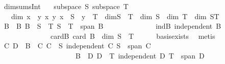 \begin{isabellebody}
\isanewline
%
\endisadelimproof
\isanewline
{}\isamarkupfalse%
\ dim{\isacharunderscore}{\kern0pt}sums{\isacharunderscore}{\kern0pt}Int{\isacharcolon}{\kern0pt}\isanewline
\ \ \ {\isachardoublequoteopen}subspace\ S{\isachardoublequoteclose}\ {\isachardoublequoteopen}subspace\ T{\isachardoublequoteclose}\isanewline
\ \ \ {\isachardoublequoteopen}dim\ {\isacharbraceleft}{\kern0pt}x\ {\isacharplus}{\kern0pt}\ y\ {\isacharbar}{\kern0pt}x\ y{\isachardot}{\kern0pt}\ x\ {\isasymin}\ S\ {\isasymand}\ y\ {\isasymin}\ T{\isacharbraceright}{\kern0pt}\ {\isacharplus}{\kern0pt}\ dim{\isacharparenleft}{\kern0pt}S\ {\isasyminter}\ T{\isacharparenright}{\kern0pt}\ {\isacharequal}{\kern0pt}\ dim\ S\ {\isacharplus}{\kern0pt}\ dim\ T{\isachardoublequoteclose}\ {\isacharparenleft}{\kern0pt}\ {\isachardoublequoteopen}dim\ {\isacharquery}{\kern0pt}ST\ {\isacharplus}{\kern0pt}\ {\isacharunderscore}{\kern0pt}\ {\isacharequal}{\kern0pt}\ {\isacharunderscore}{\kern0pt}{\isachardoublequoteclose}{\isacharparenright}{\kern0pt}\isanewline
%
\isadelimproof
%
\endisadelimproof
%
\isatagproof
{}\isamarkupfalse%
\ {\isacharminus}{\kern0pt}\isanewline
\ \ \isamarkupfalse%
\ B\ \ B{\isacharcolon}{\kern0pt}\ {\isachardoublequoteopen}B\ {\isasymsubseteq}\ S\ {\isasyminter}\ T{\isachardoublequoteclose}\ {\isachardoublequoteopen}S\ {\isasyminter}\ T\ {\isasymsubseteq}\ span\ B{\isachardoublequoteclose}\isanewline
\ \ \ \ \ \ \ \ \ \ \ \ \ \ indB{\isacharcolon}{\kern0pt}\ {\isachardoublequoteopen}independent\ B{\isachardoublequoteclose}\isanewline
\ \ \ \ \ \ \ \ \ \ \ \ \ \ cardB{\isacharcolon}{\kern0pt}\ {\isachardoublequoteopen}card\ B\ {\isacharequal}{\kern0pt}\ dim\ {\isacharparenleft}{\kern0pt}S\ {\isasyminter}\ T{\isacharparenright}{\kern0pt}{\isachardoublequoteclose}\isanewline
\ \ \ \ \isamarkupfalse%
\ basis{\isacharunderscore}{\kern0pt}exists\ \isamarkupfalse%
\ metis\isanewline
\ \ \isamarkupfalse%
\ \isamarkupfalse%
\ C\ D\ \ {\isachardoublequoteopen}B\ {\isasymsubseteq}\ C{\isachardoublequoteclose}\ {\isachardoublequoteopen}C\ {\isasymsubseteq}\ S{\isachardoublequoteclose}\ {\isachardoublequoteopen}independent\ C{\isachardoublequoteclose}\ {\isachardoublequoteopen}S\ {\isasymsubseteq}\ span\ C{\isachardoublequoteclose}\isanewline
\ \ \ \ \ \ \ \ \ \ \ \ \ \ \ \ \ \ \ \ \ {\isachardoublequoteopen}B\ {\isasymsubseteq}\ D{\isachardoublequoteclose}\ {\isachardoublequoteopen}D\ {\isasymsubseteq}\ T{\isachardoublequoteclose}\ {\isachardoublequoteopen}independent\ D{\isachardoublequoteclose}\ {\isachardoublequoteopen}T\ {\isasymsubseteq}\ span\ D{\isachardoublequoteclose}\isanewline

\end{isabellebody}

